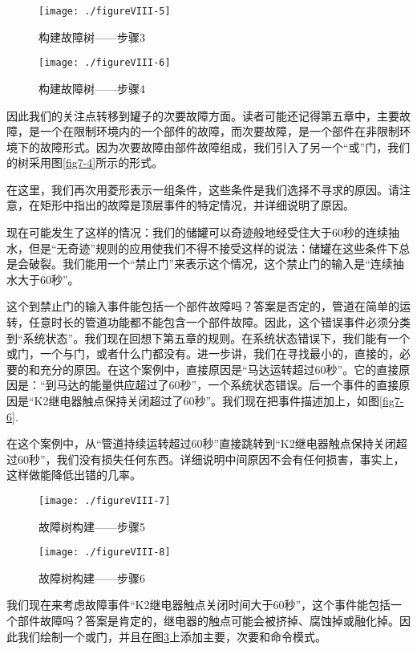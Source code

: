 \documentclass[cn,11pt,chinese]{elegantbook}
\begin{document}
{\begin{figure}[H]
	\centering
	\texttt{[image: ./figureVIII-5]}
	\caption{构建故障树——步骤3}
	\label{fig8-5}
\end{figure}

\begin{figure}[H]
	\centering
	\texttt{[image: ./figureVIII-6]}
	\caption{构建故障树——步骤4}
	\label{fig8-6}
\end{figure}

因此我们的关注点转移到罐子的次要故障方面。读者可能还记得第五章中，主要故障，是一个在限制环境内的一个部件的故障，而次要故障，是一个部件在非限制环境下的故障形式。因为次要故障由部件故障组成，我们引入了另一个“或”门，我们的树采用图\ref{fig7-4}所示的形式。

在这里，我们再次用菱形表示一组条件，这些条件是我们选择不寻求的原因。请注意，在矩形中指出的故障是顶层事件的特定情况，并详细说明了原因。

现在可能发生了这样的情况：我们的储罐可以奇迹般地经受住大于60秒的连续抽水，但是“无奇迹”规则的应用使我们不得不接受这样的说法：储罐在这些条件下总是会破裂。我们能用一个“禁止门”来表示这个情况，这个禁止门的输入是“连续抽水大于60秒”。

这个到禁止门的输入事件能包括一个部件故障吗？答案是否定的，管道在简单的运转，任意时长的管道功能都不能包含一个部件故障。因此，这个错误事件必须分类到“系统状态”。我们现在回想下第五章的规则。在系统状态错误下，我们能有一个或门，一个与门，或者什么门都没有。进一步讲，我们在寻找最小的，直接的，必要的和充分的原因。在这个案例中，直接原因是“马达运转超过60秒”。它的直接原因是：“到马达的能量供应超过了60秒”，一个系统状态错误。后一个事件的直接原因是“K2继电器触点保持关闭超过了60秒”。我们现在把事件描述加上，如图\ref{fig7-6}.

在这个案例中，从“管道持续运转超过60秒”直接跳转到“K2继电器触点保持关闭超过60秒”，我们没有损失任何东西。详细说明中间原因不会有任何损害，事实上，这样做能降低出错的几率。

\begin{figure}[H]
	\centering
	\texttt{[image: ./figureVIII-7]}
	\caption{故障树构建——步骤5}
	\label{fig8-7}
\end{figure}

\begin{figure}[H]
	\centering
	\texttt{[image: ./figureVIII-8]}
	\caption{故障树构建——步骤6}
	\label{fig8-8}
\end{figure}

我们现在来考虑故障事件“K2继电器触点关闭时间大于60秒”，这个事件能包括一个部件故障吗？答案是肯定的，继电器的触点可能会被挤掉、腐蚀掉或融化掉。因此我们绘制一个或门，并且在图\ref{fig8-7}上添加主要，次要和命令模式。

}
\end{document}
